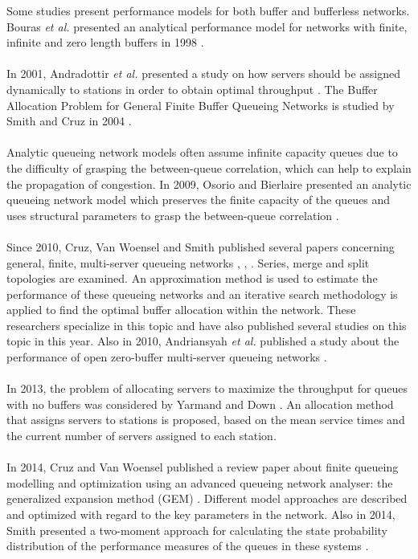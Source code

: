 \documentclass[twoside]{article}
\begin{document}
\begin{multicols}{2}
Some studies present performance models for both buffer and bufferless networks. Bouras \textit{et al.} presented an analytical performance model for networks with finite, infinite and zero length buffers in 1998 \cite{article16}.
\\\\
In 2001, Andradottir \textit{et al.} presented a study on how servers should be assigned dynamically to stations in order to obtain optimal throughput \cite{article15}. The Buffer Allocation Problem for General Finite Buffer Queueing Networks is studied by Smith and Cruz in 2004 \cite{article13}. \\\\
Analytic queueing network models often assume infinite capacity queues due to the difficulty of grasping the between-queue correlation, which can help to explain the propagation of congestion. In 2009, Osorio and Bierlaire presented an analytic queueing network model which preserves the finite capacity of the queues and uses structural parameters to grasp the between-queue correlation \cite{article21}. \\\\
Since 2010, Cruz, Van Woensel and Smith published several papers concerning general, finite, multi-server queueing networks \cite{article3}, \cite{article4}, \cite{article11}. Series, merge and split topologies are examined. An approximation method is used to estimate the performance of these queueing networks and an iterative search methodology is applied to find the optimal buffer allocation within the network.
These researchers specialize in this topic and have also published several studies on this topic in this year. Also in 2010, Andriansyah \textit{et al.} published a study about the performance of open zero-buffer multi-server queueing networks \cite{own}. \\\\
In 2013, the problem of allocating servers to maximize the throughput for queues with no buffers was considered by Yarmand and Down \cite{article1}. An allocation method that assigns servers to stations is proposed, based on the mean service times and the current number of servers assigned to each station. \\\\
In 2014, Cruz and Van Woensel published a review paper about finite queueing modelling and optimization using an advanced queueing network analyser: the generalized expansion method (GEM) \cite{article9}.  Different model approaches are described and optimized with regard to the key parameters in the network. Also in 2014, Smith presented a two-moment approach for calculating the state probability distribution of the performance measures of the queues in these systems \cite{article14}.


\end{multicols}
\end{document}
